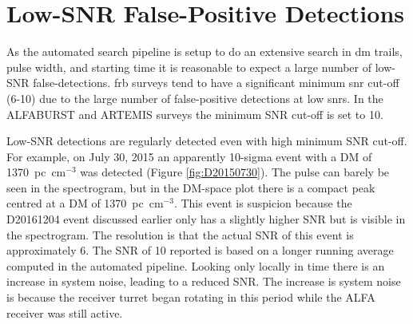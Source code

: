 \documentclass[a4paper,fleqn,usenatbib]{mnras}
\begin{document}
\section{Low-SNR False-Positive Detections}
\label{sec:low_snr}

As the automated search pipeline is setup to do an extensive search in \gls{dm}
trails, pulse width, and starting time it is reasonable to expect a large number
of low-SNR false-detections.  \gls{frb} surveys tend to have a significant
minimum \gls{snr} cut-off (6-10) due to the large number of false-positive
detections at low \glspl{snr}.  In the ALFABURST and ARTEMIS
\citep{2015MNRAS.452.1254K} surveys the minimum SNR cut-off is set to 10.

Low-SNR detections are regularly detected even with high minimum SNR cut-off.
For example, on July 30, 2015 an apparently 10-sigma event with a DM of
1370~pc~cm$^{-3}$ was detected (Figure \ref{fig:D20150730}). The pulse can
barely be seen in the spectrogram, but in the DM-space plot there is a compact
peak centred at a DM of 1370~pc~cm$^{-3}$. This event is suspicion because the
D20161204 event discussed earlier only has a slightly higher SNR but is visible
in the spectrogram. The resolution is that the actual SNR of this event is
approximately 6. The SNR of 10 reported is based on a longer running average
computed in the automated pipeline. Looking only locally in time there is an
increase in system noise, leading to a reduced SNR. The increase is system noise
is because the receiver turret began rotating in this period while the ALFA
receiver was still active.
\end{document}
